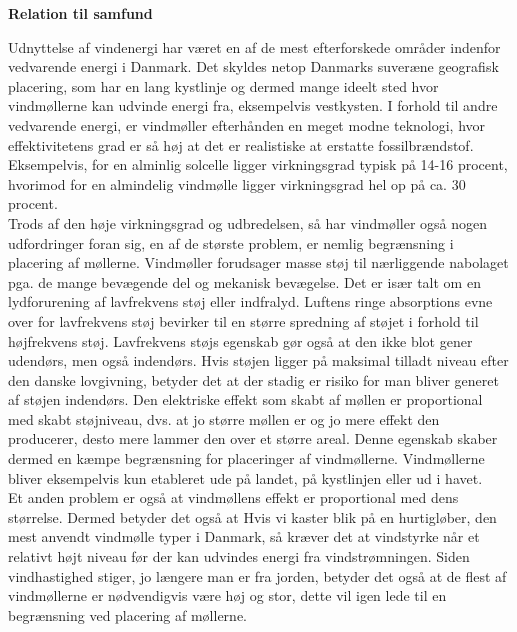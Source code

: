 \textbf{Relation til samfund}

Udnyttelse af vindenergi har været en af de mest efterforskede områder indenfor vedvarende energi i Danmark. Det skyldes netop Danmarks suveræne geografisk placering, som har en lang kystlinje og dermed mange ideelt sted hvor vindmøllerne kan udvinde energi fra, eksempelvis vestkysten. I forhold til andre vedvarende energi, er vindmøller efterhånden en meget modne teknologi, hvor effektivitetens grad er så høj at det er realistiske at erstatte fossilbrændstof. Eksempelvis, for en alminlig solcelle ligger virkningsgrad typisk på 14-16 procent, hvorimod for en almindelig vindmølle ligger virkningsgrad hel op på ca. 30 procent.    \\
Trods af den høje virkningsgrad og udbredelsen, så har vindmøller også nogen udfordringer foran sig, en af de største problem, er nemlig begrænsning i placering af møllerne. Vindmøller forudsager masse støj til nærliggende nabolaget pga. de mange bevægende del og mekanisk bevægelse. Det er især talt om en lydforurening af lavfrekvens støj eller indfralyd. Luftens ringe absorptions evne over for lavfrekvens støj bevirker til en større spredning af støjet i forhold til højfrekvens støj. Lavfrekvens støjs egenskab gør også at den ikke blot gener udendørs, men også indendørs. Hvis støjen ligger på maksimal tilladt niveau efter den danske lovgivning, betyder det at der stadig er risiko for man bliver generet af støjen indendørs. Den elektriske effekt som skabt af møllen er proportional med skabt støjniveau, dvs. at jo større møllen er og jo mere effekt den producerer, desto mere lammer den over et større areal.  Denne egenskab skaber dermed en kæmpe begrænsning for placeringer af vindmøllerne.  Vindmøllerne bliver eksempelvis kun etableret ude på landet, på kystlinjen eller ud i havet.  \\
Et anden problem er også at vindmøllens effekt er proportional med dens størrelse. Dermed betyder det også at Hvis vi kaster blik på en hurtigløber, den mest anvendt vindmølle typer i Danmark, så kræver det at vindstyrke når et relativt højt niveau før der kan udvindes energi fra vindstrømningen. Siden vindhastighed stiger, jo længere man er fra jorden, betyder det også at de flest af vindmøllerne er nødvendigvis være høj og stor, dette vil igen lede til en begrænsning ved placering af møllerne.  \\
